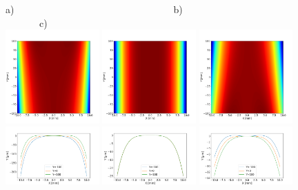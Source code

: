 \documentclass{iucr}              %
\begin{document}
\begin{figure}\label{fig:detrended}
\flushleft
a)~~~~~~~~~~~~~~~~~~~~~~~~~~~~~~~~~b)~~~~~~~~~~~~~~~~~~~~~~~~~~~~~~c)\\
\centering
\includegraphics[width=0.32\textwidth]{figures/diaboloid_detrended_1:5_image.png} 
\includegraphics[width=0.32\textwidth]{figures/diaboloid_detrended_1:2_image.png} 
\includegraphics[width=0.32\textwidth]{figures/diaboloid_detrended_1:1_image.png} \\
\includegraphics[width=0.32\textwidth]{figures/diaboloid_detrended_1:5_profile.png}
\includegraphics[width=0.32\textwidth]{figures/diaboloid_detrended_1:2_profile.png}
\includegraphics[width=0.32\textwidth]{figures/diaboloid_detrended_1:1_profile.png}


\end{figure}
\end{document}

